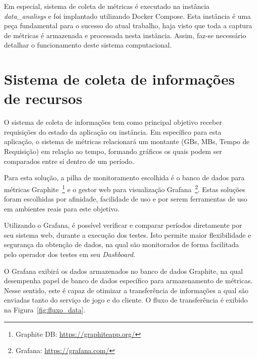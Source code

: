 Em especial, sistema de coleta de métricas é executado na instância \textit{data\_analisys} e foi implantado utilizando Docker Compose.
%
Esta instância é uma peça fundamental para o sucesso do atual trabalho, haja visto que toda a captura de métricas é armazenada e processada nesta instância.
%
Assim, faz-se necessário detalhar o funcionamento deste sistema computacional.


\section{Sistema de coleta de informações de recursos}
\label{sec:informacoes}

O sistema de coleta de informações tem como principal objetivo receber requisições do estado da aplicação ou instância.
%
Em específico para esta aplicação, o sistema de métricas relacionará um montante (GBs, MBs, Tempo de Requisição) em relação ao tempo, formando gráficos os quais podem ser comparados entre sí dentro de um período.

Para esta solução, a pilha de monitoramento escolhida é o banco de dados para métricas Graphite~\footnote{Graphite DB: \url{https://graphiteapp.org/}} e o gestor web para visualização Grafana~\footnote{Grafana: \url{https://grafana.com/}}.
%
Estas soluções foram escolhidas por afinidade, facilidade de uso e por serem ferramentas de uso em ambientes reais para este objetivo.



Utilizando o Grafana, é possível verificar e comparar períodos diretamente por seu sistema web, durante a execução dos testes.
%
Isto permite maior flexibilidade e segurança da obtenção de dados, na qual são monitorados de forma facilitada pelo operador dos testes em seu \textit{Dashboard}.

O Grafana exibirá os dados armazenados no banco de dados Graphite, na qual desempenha papel de banco de dados específico para armazenamento de métricas.
%
Nesse sentido, este é capaz de otimizar a transferência de informações a qual são enviadas tanto do serviço de jogo e do cliente.
%
O fluxo de transferência é exibido na Figura~\ref{fig:fluxo_data}.

